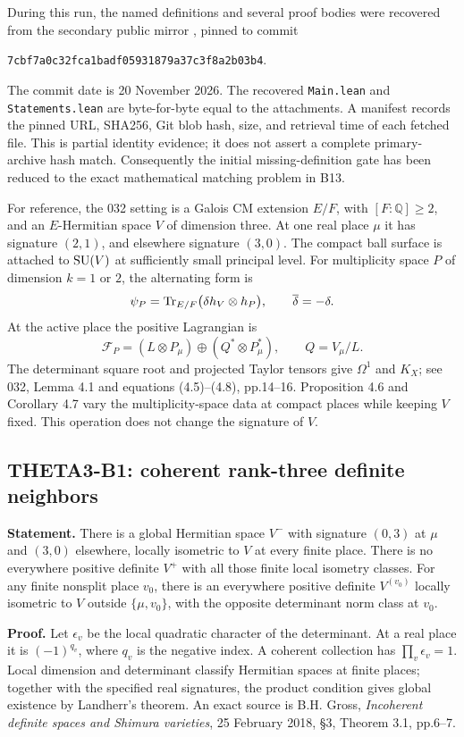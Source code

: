 \documentclass[11pt]{article}
\newcommand{\Q}{\mathbb Q}\newcommand{\C}{\mathbb C}\newcommand{\Z}{\mathbb Z}\newcommand{\R}{\mathbb R}\newcommand{\A}{\mathbb A}\newcommand{\OO}{\mathcal O}
\theoremstyle{definition}\newtheorem{definition}[theorem]{Definition}\newtheorem{remark}[theorem]{Remark}
\begin{document}
During this run, the named definitions and several proof bodies were recovered from the secondary public mirror , pinned to commit
\begin{center}\small\nolinkurl{7cbf7a0c32fca1badf05931879a37c3f8a2b03b4}.\end{center}
The commit date is 20 November 2026. The recovered \texttt{Main.lean} and \texttt{Statements.lean} are byte-for-byte equal to the attachments. A manifest records the pinned URL, SHA256, Git blob hash, size, and retrieval time of each fetched file. This is partial identity evidence; it does not assert a complete primary-archive hash match. Consequently the initial missing-definition gate has been reduced to the exact mathematical matching problem in B13.

For reference, the 032 setting is a Galois CM extension $E/F$, with $[F:\Q]\geq2$, and an $E$-Hermitian space $V$ of dimension three. At one real place $\mu$ it has signature $(2,1)$, and elsewhere signature $(3,0)$. The compact ball surface is attached to $\operatorname{SU}(V)$ at sufficiently small principal level. For multiplicity space $P$ of dimension $k=1$ or $2$, the alternating form is
\[
 \psi_P=\operatorname{Tr}_{E/F}\bigl(\delta h_V\otimes h_P\bigr),
 \qquad \overline\delta=-\delta.
\]
At the active place the positive Lagrangian is
\[
 \mathcal F_P=(L\otimes P_\mu)\oplus(Q^*\otimes P_\mu^*),
 \qquad Q=V_\mu/L.
\]
The determinant square root and projected Taylor tensors give $\Omega^1$ and $K_X$; see 032, Lemma 4.1 and equations (4.5)--(4.8), pp.14--16. Proposition 4.6 and Corollary 4.7 vary the multiplicity-space data at compact places while keeping $V$ fixed. This operation does not change the signature of $V$.

\subsection{THETA3-B1: coherent rank-three definite neighbors}\label{B1}

\textbf{Statement.} There is a global Hermitian space $V^-$ with signature $(0,3)$ at $\mu$ and $(3,0)$ elsewhere, locally isometric to $V$ at every finite place. There is no everywhere positive definite $V^+$ with all those finite local isometry classes. For any finite nonsplit place $v_0$, there is an everywhere positive definite $V^{(v_0)}$ locally isometric to $V$ outside $\{\mu,v_0\}$, with the opposite determinant norm class at $v_0$.

\textbf{Proof.} Let $\epsilon_v$ be the local quadratic character of the determinant. At a real place it is $(-1)^{q_v}$, where $q_v$ is the negative index. A coherent collection has $\prod_v\epsilon_v=1$. Local dimension and determinant classify Hermitian spaces at finite places; together with the specified real signatures, the product condition gives global existence by Landherr's theorem. An exact source is B.H. Gross, \emph{Incoherent definite spaces and Shimura varieties}, 25 February 2018, \S3, Theorem 3.1, pp.6--7.
\end{document}
